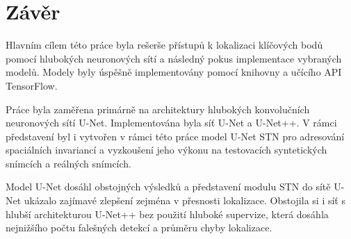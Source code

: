 \chapter{Závěr}
\label{sec:Chapter7}
Hlavním cílem této práce byla rešerše přístupů k lokalizaci klíčových bodů pomocí hlubokých neuronových sítí a následný pokus implementace vybraných modelů. Modely byly úspěšně implementovány pomocí knihovny a učícího API TensorFlow.

Práce byla zaměřena primárně na architektury hlubokých konvolučních neuronových sítí U-Net. Implementována byla síť U-Net a U-Net++. V rámci představení byl i vytvořen v rámci této práce model U-Net STN pro adresování spaciálních invariancí a vyzkoušení jeho výkonu na testovacích syntetických snímcích a reálných snímcích.

Model U-Net dosáhl obstojných výsledků a představení modulu STN do sítě U-Net ukázalo zajímavé zlepšení zejména v přesnosti lokalizace. Obstojila si i síť s hlubší architekturou U-Net++ bez použití hluboké supervize, která dosáhla nejnižšího počtu falešných detekcí a průměru chyby lokalizace.
\endinput